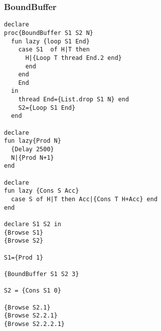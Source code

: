 \documentclass[]{article}
\begin{document}
\hypertarget{boundbuffer}{%
\subsubsection{BoundBuffer}\label{boundbuffer}}

\begin{verbatim}
declare
proc{BoundBuffer S1 S2 N}
  fun lazy {loop S1 End}
    case S1  of H|T then
      H|{Loop T thread End.2 end}
      end
    end
    End
  in
    thread End={List.drop S1 N} end
    S2={Loop S1 End}
  end

declare
fun lazy{Prod N}
  {Delay 2500}
  N|{Prod N+1}
end

declare
fun lazy {Cons S Acc}
  case S of H|T then Acc|{Cons T H+Acc} end
end

declare S1 S2 in
{Browse S1}
{Browse S2}

S1={Prod 1}

{BoundBuffer S1 S2 3}

S2 = {Cons S1 0}

{Browse S2.1}
{Browse S2.2.1}
{Browse S2.2.2.1}
\end{verbatim}
\end{document}

